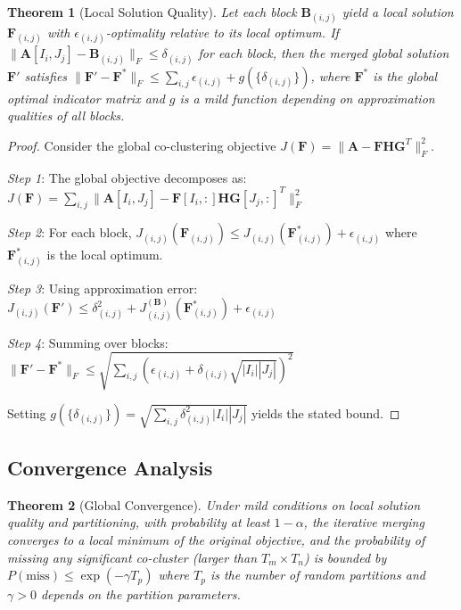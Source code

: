 \documentclass[journal]{IEEEtran}
\newtheorem{theorem}{Theorem}
\begin{document}
\begin{theorem}[Local Solution Quality]
    \label{thm:local-solution-quality}
    Let each block $\mathbf{B}_{(i,j)}$ yield a local solution $\mathbf{F}_{(i,j)}$ with $\epsilon_{(i,j)}$-optimality relative to its local optimum. If $\|\mathbf{A}[I_i,J_j] - \mathbf{B}_{(i,j)}\|_F \le \delta_{(i,j)}$ for each block, then the merged global solution $\mathbf{F}'$ satisfies $\|\mathbf{F}' - \mathbf{F}^*\|_F \le \sum_{i,j} \epsilon_{(i,j)} + g(\{\delta_{(i,j)}\})$, where $\mathbf{F}^*$ is the global optimal indicator matrix and $g$ is a mild function depending on approximation qualities of all blocks.
\end{theorem}

\begin{proof}
    Consider the global co-clustering objective $J(\mathbf{F}) = \|\mathbf{A} - \mathbf{F}\mathbf{H}\mathbf{G}^T\|_F^2$.

    \textit{Step 1}: The global objective decomposes as: $J(\mathbf{F}) = \sum_{i,j} \|\mathbf{A}[I_i, J_j] - \mathbf{F}[I_i, :]\mathbf{H}\mathbf{G}[J_j, :]^T\|_F^2$

    \textit{Step 2}: For each block, $J_{(i,j)}(\mathbf{F}_{(i,j)}) \leq J_{(i,j)}(\mathbf{F}_{(i,j)}^*) + \epsilon_{(i,j)}$ where $\mathbf{F}_{(i,j)}^*$ is the local optimum.

    \textit{Step 3}: Using approximation error: $J_{(i,j)}(\mathbf{F}') \leq \delta_{(i,j)}^2 + J_{(i,j)}^{(\mathbf{B})}(\mathbf{F}_{(i,j)}^*) + \epsilon_{(i,j)}$

    \textit{Step 4}: Summing over blocks: $\|\mathbf{F}' - \mathbf{F}^*\|_F \leq \sqrt{\sum_{i,j} (\epsilon_{(i,j)} + \delta_{(i,j)}\sqrt{|I_i||J_j|})^2}$

    Setting $g(\{\delta_{(i,j)}\}) = \sqrt{\sum_{i,j} \delta_{(i,j)}^2|I_i||J_j|}$ yields the stated bound.
\end{proof}

\subsection{Convergence Analysis}

\begin{theorem}[Global Convergence]
    \label{thm:global-convergence}
    Under mild conditions on local solution quality and partitioning, with probability at least $1-\alpha$, the iterative merging converges to a local minimum of the original objective, and the probability of missing any significant co-cluster (larger than $T_m \times T_n$) is bounded by $P(\text{miss}) \le \exp(-\gamma T_p)$ where $T_p$ is the number of random partitions and $\gamma > 0$ depends on the partition parameters.
\end{theorem}
\end{document}
